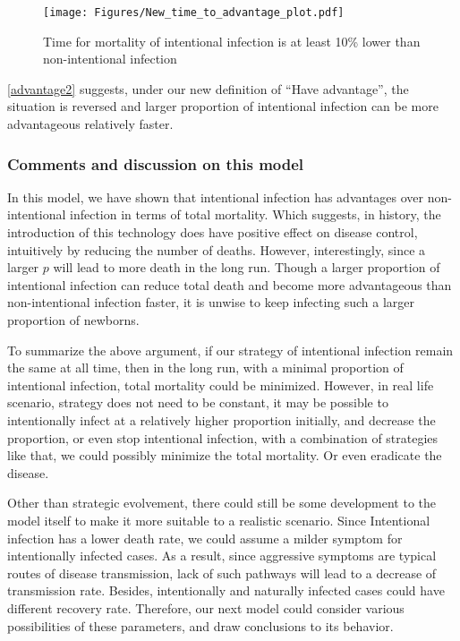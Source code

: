 \documentclass[12pt]{article}
\begin{document}
\begin{figure}[H]
  \caption{Time for mortality of intentional infection is at least 10\% lower than non-intentional infection}\label{advantage2}
  \centering
  \texttt{[image: Figures/New\_time\_to\_advantage\_plot.pdf]}
\end{figure}
\autoref{advantage2} suggests, under our new definition of ``Have advantage'', the situation is reversed and larger proportion of intentional infection can be more advantageous relatively faster.

\subsubsection{Comments and discussion on this model}

In this model, we have shown that intentional infection has advantages over non-intentional infection in terms of total mortality. Which suggests, in history, the introduction of this technology does have positive effect on disease control, intuitively by reducing the number of deaths. However, interestingly, since a larger $p$ will lead to more death in the long run. Though a larger proportion of intentional infection can reduce total death and become more advantageous than non-intentional infection faster, it is unwise to keep infecting such a larger proportion of newborns. 

To summarize the above argument, if our strategy of intentional infection remain the same at all time, then in the long run, with a minimal proportion of intentional infection, total mortality could be minimized. However, in real life scenario, strategy does not need to be constant, it may be possible to intentionally infect at a relatively higher proportion initially, and decrease the proportion, or even stop intentional infection, with a combination of strategies like that, we could possibly minimize the total mortality. Or even eradicate the disease.

Other than strategic evolvement, there could still be some development to the model itself to make it more suitable to a realistic scenario. Since Intentional infection has a lower death rate, we could assume a milder symptom for intentionally infected cases. As a result, since aggressive symptoms are typical routes of disease transmission, lack of such pathways will lead to a decrease of transmission rate. Besides, intentionally and naturally infected cases could have different recovery rate. Therefore, our next model could consider various possibilities of these parameters, and draw conclusions to its behavior.
\end{document}

